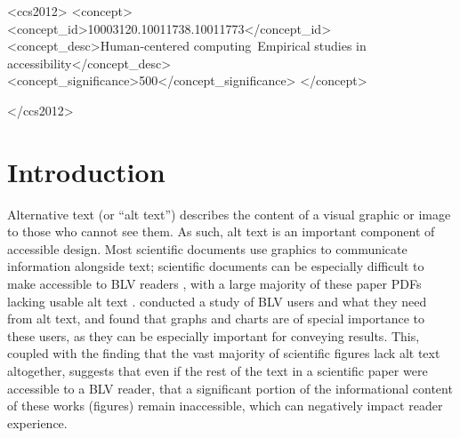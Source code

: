 \documentclass[sigconf]{acmart}
\begin{document}
\begin{CCSXML}
<ccs2012>
  <concept>
      <concept_id>10003120.10011738.10011773</concept_id>
      <concept_desc>Human-centered computing~Empirical studies in accessibility</concept_desc>
      <concept_significance>500</concept_significance>
      </concept>

 </ccs2012>
\end{CCSXML}




\maketitle

\section{Introduction}
\label{sec:introduction}

Alternative text (or ``alt text'')
describes the content of a visual graphic or image to those who cannot see them. As such, alt text is an important component of accessible design. 
Most scientific documents use graphics to communicate information alongside text; scientific documents can be especially difficult to make accessible to BLV readers \citep{Bigham2016AnUT}, with a large majority of these paper PDFs lacking usable alt text \citep{Wang2021ImprovingTA}. \citet{Mack2021DesigningTF} conducted a study of BLV users and what they need from alt text, and found that graphs and charts are of special importance to these users, as they can be especially important for conveying results. This, coupled with the finding that the vast majority of scientific figures lack alt text altogether, suggests that even if the rest of the text in a scientific paper were accessible to a BLV reader, that a significant portion of the informational content of these works (figures) remain inaccessible, which can negatively impact reader experience.
\end{document}
